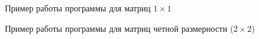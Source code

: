 \documentclass[a4paper,12pt]{article}
\begin{document}
            
            \begin{figure}[h!]
                \caption{Пример работы программы для матриц $1 \times 1$}
                \label{fig:image_test_2}
            \end{figure}        
        
            \begin{figure}[h!]
                \caption{Пример работы программы для матриц четной размерности ($2 \times 2$)}
                \label{fig:image_test_3}
            \end{figure}
            
\end{document}
